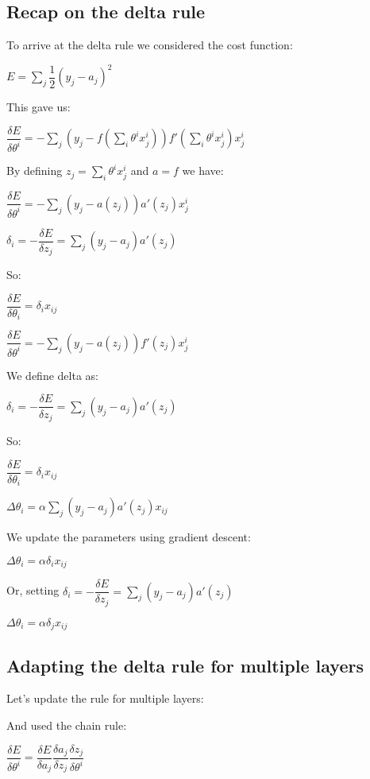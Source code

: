 
\subsection{Recap on the delta rule}

To arrive at the delta rule we considered the cost function:

\(E=\sum_j\dfrac{1}{2}(y_j-a_j)^2\)

This gave us:

\(\dfrac{\delta E}{\delta \theta^i }=-\sum_j(y_j-f(\sum_i\theta^i x_j^i))f'(\sum_i\theta^ix_j^i)x_j^i\)

By defining \(z_j=\sum_i\theta^ix_j^i\) and \(a=f\) we have:

\(\dfrac{\delta E}{\delta \theta^i }=-\sum_j(y_j-a(z_j))a'(z_j)x_j^i\)

\(\delta_i=-\dfrac{\delta E}{\delta z_j}=\sum_j(y_j-a_j)a'(z_j)\)

So:

\(\dfrac{\delta E}{\delta \theta_i }=\delta_i x_{ij}\)

\(\dfrac{\delta E}{\delta \theta^i }=-\sum_j(y_j-a(z_j))f'(z_j)x_j^i\)


We define delta as:

\(\delta_i=-\dfrac{\delta E}{\delta z_j}=\sum_j(y_j-a_j)a'(z_j)\)

So:

\(\dfrac{\delta E}{\delta \theta_i }=\delta_i x_{ij}\)


\(\Delta \theta_i=\alpha \sum_j(y_j-a_j)a'(z_j)x_{ij}\)

We update the parameters using gradient descent:

\(\Delta \theta_i=\alpha \delta_i x_{ij}\)



Or, setting \(\delta_i=-\dfrac{\delta E}{\delta z_j}=\sum_j(y_j-a_j)a'(z_j)\)

\(\Delta \theta_i=\alpha \delta_j x_{ij}\)

\subsection{Adapting the delta rule for multiple layers}

Let's update the rule for multiple layers:

And used the chain rule:

\(\dfrac{\delta E}{\delta \theta^i }=\dfrac{\delta E}{\delta a_j}\dfrac{\delta a_j}{\delta z_j}\dfrac{\delta z_j}{\delta \theta^i}\)

